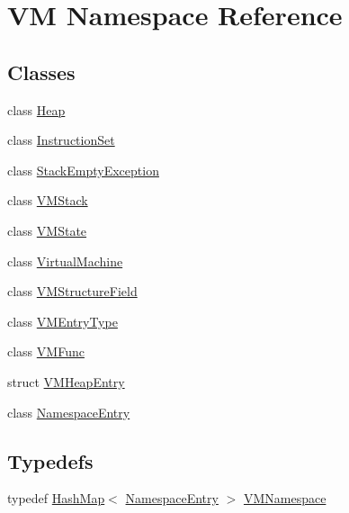 \hypertarget{namespace_v_m}{\section{V\-M Namespace Reference}
\label{namespace_v_m}
}
\subsection*{Classes}
\begin{DoxyCompactItemize}
\item 
class \hyperlink{class_v_m_1_1_heap}{Heap}
\item 
class \hyperlink{class_v_m_1_1_instruction_set}{Instruction\-Set}
\item 
class \hyperlink{class_v_m_1_1_stack_empty_exception}{Stack\-Empty\-Exception}
\item 
class \hyperlink{class_v_m_1_1_v_m_stack}{V\-M\-Stack}
\item 
class \hyperlink{class_v_m_1_1_v_m_state}{V\-M\-State}
\item 
class \hyperlink{class_v_m_1_1_virtual_machine}{Virtual\-Machine}
\item 
class \hyperlink{class_v_m_1_1_v_m_structure_field}{V\-M\-Structure\-Field}
\item 
class \hyperlink{class_v_m_1_1_v_m_entry_type}{V\-M\-Entry\-Type}
\item 
class \hyperlink{class_v_m_1_1_v_m_func}{V\-M\-Func}
\item 
struct \hyperlink{struct_v_m_1_1_v_m_heap_entry}{V\-M\-Heap\-Entry}
\item 
class \hyperlink{class_v_m_1_1_namespace_entry}{Namespace\-Entry}
\end{DoxyCompactItemize}
\subsection*{Typedefs}
\begin{DoxyCompactItemize}
\item 
typedef \hyperlink{class_hash_map}{Hash\-Map}$<$ \hyperlink{class_v_m_1_1_namespace_entry}{Namespace\-Entry} $>$ \hyperlink{namespace_v_m_ae5114cdcbed0f8d77a2c87137e08895e}{V\-M\-Namespace}
\end{DoxyCompactItemize}

